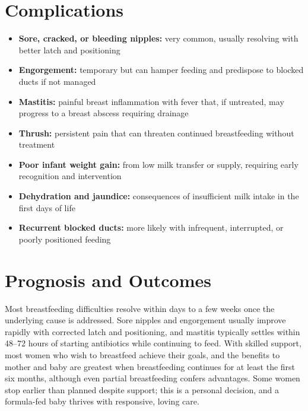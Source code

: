 \section*{Complications}
\begin{itemize}
    \item \textbf{Sore, cracked, or bleeding nipples:} very common, usually resolving with better latch and positioning
    \item \textbf{Engorgement:} temporary but can hamper feeding and predispose to blocked ducts if not managed
    \item \textbf{Mastitis:} painful breast inflammation with fever that, if untreated, may progress to a breast abscess requiring drainage
    \item \textbf{Thrush:} persistent pain that can threaten continued breastfeeding without treatment
    \item \textbf{Poor infant weight gain:} from low milk transfer or supply, requiring early recognition and intervention
    \item \textbf{Dehydration and jaundice:} consequences of insufficient milk intake in the first days of life
    \item \textbf{Recurrent blocked ducts:} more likely with infrequent, interrupted, or poorly positioned feeding
\end{itemize}

\section*{Prognosis and Outcomes}
Most breastfeeding difficulties resolve within days to a few weeks once the underlying cause is addressed. Sore nipples and engorgement usually improve rapidly with corrected latch and positioning, and mastitis typically settles within 48--72 hours of starting antibiotics while continuing to feed. With skilled support, most women who wish to breastfeed achieve their goals, and the benefits to mother and baby are greatest when breastfeeding continues for at least the first six months, although even partial breastfeeding confers advantages. Some women stop earlier than planned despite support; this is a personal decision, and a formula-fed baby thrives with responsive, loving care.

